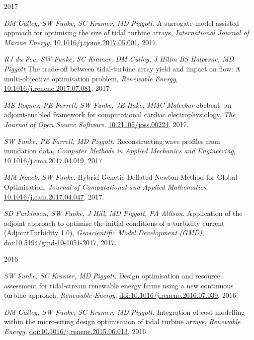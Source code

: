 \documentclass[11pt]{article}
\begin{document}
2017
\begin{etaremune} 
\setcounter{enumi}{16}
    \item \textit{DM Culley, SW Funke, SC Kramer, MD Piggott.} A surrogate-model assisted approach for optimising the size of tidal turbine arrays, \textit{International Journal of Marine Energy}, \href{https://doi.org/10.1016/j.ijome.2017.05.001}{10.1016/j.ijome.2017.05.001}, 2017.
    \item \textit{RJ du Feu, SW Funke, SC Kramer, DM Culley, J Hillm BS Halperne, MD Piggott} The trade-off between tidal-turbine array yield and impact on flow: A multi-objective optimisation problem, \textit{Renewable Energy}, \href{https://doi.org/10.1016/j.renene.2017.07.081}{10.1016/j.renene.2017.07.081}, 2017.
    \item \textit{ME Rognes, PE Farrell, SW Funke, JE Hake, MMC Maleckar} cbcbeat: an adjoint-enabled framework for computational cardiac electrophysiology, \textit{The Journal of Open Source Software}, \href{http://dx.doi.org/10.21105/joss.00224}{10.21105/joss.00224}, 2017.
    \item \textit{SW Funke, PE Farrell, MD Piggott.} Reconstructing wave profiles from inundation data, \textit{Computer Methods in Applied Mechanics and Engineering}, \href{https://doi.org/10.1016/j.cma.2017.04.019}{10.1016/j.cma.2017.04.019}, 2017.
    \item \textit{MM Noack, SW Funke.} Hybrid Genetic Deflated Newton Method for Global Optimisation, \textit{Journal of Computational and Applied Mathematics}, \href{http://dx.doi.org/10.1016/j.cam.2017.04.047}{10.1016/j.cam.2017.04.047}, 2017.
    \item \textit{SD Parkinson, SW Funke, J Hill, MD Piggott, PA Allison.} Application of the adjoint approach to optimise the initial conditions of a turbidity current (AdjointTurbidity 1.0), \textit{Geoscientific Model Development (GMD)}, \href{https://dx.doi.org/10.5194/gmd-10-1051-2017}{doi:10.5194/gmd-10-1051-2017}, 2017.
\end{etaremune}
2016
\begin{etaremune}
\setcounter{enumi}{10}
    \item \textit{SW Funke, SC Kramer, MD Piggott.} Design optimisation and resource assessment for tidal-stream renewable energy farms using a new continuous turbine approach, \textit{Renewable Energy}, \href{https://dx.doi.org/10.1016/j.renene.2016.07.039}{doi:10.1016/j.renene.2016.07.039}, 2016.
    \item \textit{DM Culley, SW Funke, SC Kramer, MD Piggott.} Integration of cost modelling within the micro-siting design optimisation of tidal turbine arrays, \textit{Renewable Energy}, \href{https://doi.org/10.1016/j.renene.2015.06.013}{doi:10.1016/j.renene.2015.06.013}, 2016.
\end{etaremune}
\end{document}

